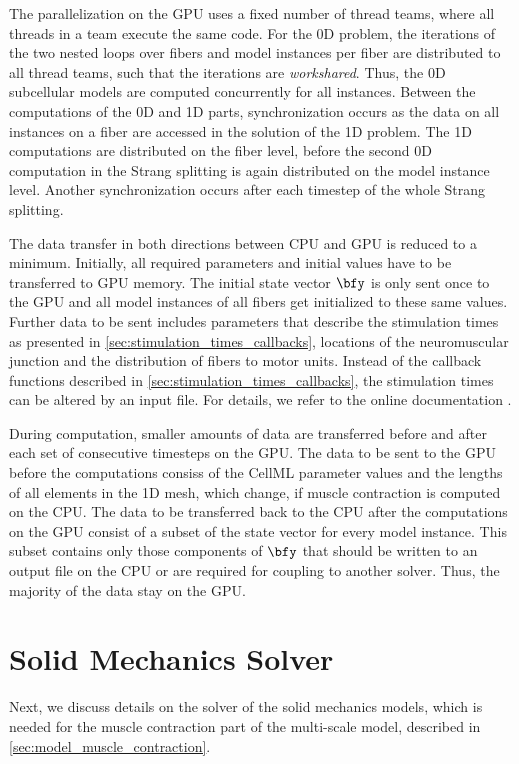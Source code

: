 The parallelization on the GPU uses a fixed number of thread teams, where all threads in a team execute the same code.
For the 0D problem, the iterations of the two nested loops over fibers and model instances per fiber are distributed to all thread teams, such that the iterations are \emph{workshared}. Thus, the 0D subcellular models are computed concurrently for all instances. Between the computations of the 0D and 1D parts, synchronization occurs as the data on all instances on a fiber are accessed in the solution of the 1D problem. The 1D computations are distributed on the fiber level, before the second 0D computation in the Strang splitting is again distributed on the model instance level.
Another synchronization occurs after each timestep of the whole Strang splitting.

The data transfer in both directions between CPU and GPU is reduced to a minimum. Initially, all required parameters and initial values have to be transferred to GPU memory. The initial state vector $\bfy$ is only sent once to the GPU and all model instances of all fibers get initialized to these same values. Further data to be sent includes parameters that describe the stimulation times as presented in \cref{sec:stimulation_times_callbacks}, locations of the neuromuscular junction and the distribution of fibers to motor units. Instead of the callback functions described in \cref{sec:stimulation_times_callbacks}, the stimulation times can be altered by an input file. For details, we refer to the online documentation \cite{opendihuWeb}.

During computation, smaller amounts of data are transferred before and after each set of consecutive timesteps on the GPU. The data to be sent to the GPU before the computations consiss of the CellML parameter values and the lengths of all elements in the 1D mesh, which change, if muscle contraction is computed on the CPU. The data to be transferred back to the CPU after the computations on the GPU consist of a subset of the state vector for every model instance. This subset contains only those components of $\bfy$ that should be written to an output file on the CPU or are required for coupling to another solver. Thus, the majority of the data stay on the GPU.


\section{Solid Mechanics Solver}\label{sec:solid_mechanics_solver}
Next, we discuss details on the solver of the solid mechanics models, which is needed for the muscle contraction part of the multi-scale model, described in \cref{sec:model_muscle_contraction}.


